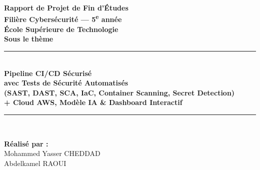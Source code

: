 \documentclass[12pt,a4paper]{report}
\begin{document}
\begin{titlepage}

    \vspace*{2.5cm}
    \begin{center}
        \textbf{\Large Rapport de Projet de Fin d'Études}\\[0.3cm]
        \textbf{\large Filière Cybersécurité --- 5\textsuperscript{e} année}\\[1cm]

        \textbf{\Large École Supérieure de Technologie}\\[1cm]

        \textbf{\large Sous le thème}\\[0.5cm]
        \noindent\rule{\textwidth}{1pt}\\[0.5cm]

        \textbf{\Huge \textcolor{primary}{Pipeline CI/CD Sécurisé}}\\[0.2cm]
        \textbf{\LARGE \textcolor{secondary}{avec Tests de Sécurité Automatisés}}\\[0.2cm]
        \textbf{\large (SAST, DAST, SCA, IaC, Container Scanning, Secret Detection)}\\[0.2cm]
        \textbf{\large + Cloud AWS, Modèle IA \& Dashboard Interactif}\\[0.5cm]

        \noindent\rule{\textwidth}{1pt}\\[1.5cm]

        \begin{minipage}{0.85\textwidth}
            \centering
            \textbf{\large Réalisé par :}\\
            Mohammed Yasser \textsc{CHEDDAD}\\
            Abdelkamel \textsc{RAOUI}\\[1cm]


\end{minipage}
\end{center}
\end{titlepage}
\end{document}
